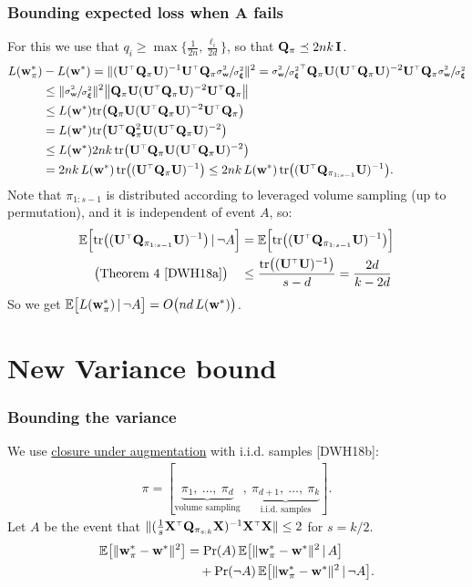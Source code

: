 \documentclass{beamer}
\begin{document}
\begin{frame}
  \frametitle{Bounding expected loss when A fails}
  For this we use that $q_i\geq
  \max\{\frac1{2n},\frac{\ell_i}{2d}\}$, so that $\mathbf Q_\pi\preceq 2nk\,\mathbf I$.
  \begin{align*}
    L(\w_\pi^*)& - L(\w^*)
= \|(\U^\top\Q_\pi\U)^{-1}\U^\top\Q_\pi\r\|^2 = \r^\top\Q_\pi\U (\U^\top\Q_\pi\U)^{-2}\U^\top\Q_\pi\r\\
&\leq \|\r\|^2 \big\|\Q_\pi\U (\U^\top\Q_\pi\U)^{-2}\U^\top\Q_\pi\big\|\\
&\leq L(\w^*)\tr\big(\Q_\pi\U
(\U^\top\Q_\pi\U)^{-2}\U^\top\Q_\pi\big)\\
&= L(\w^*)
\tr\big(\U^\top\Q_\pi^2\U(\U^\top\Q_\pi\U)^{-2}\big)\\
&\leq L(\w^*)2nk\, \tr\big(
\U^\top\Q_\pi\U(\U^\top\Q_\pi\U)^{-2}\big)\\
&=2nk\,L(\w^*)\,\tr\big((\U^\top\Q_\pi\U)^{-1}\big)\leq 2nk\,L(\w^*)\,\tr\big((\U^\top\Q_{\pi_{1:s-1}}\U)^{-1}\big).
  \end{align*}
Note that $\pi_{1:s-1}$ is distributed according to leveraged volume
sampling (up to permutation), and it is independent of event $A$, so:
\begin{align*}
  \E\Big[\tr\big((\U^\top\Q_{\pi_{1:s-1}}\U)^{-1}\big)\,|\,\neg A\Big]
  &=\E\Big[\tr\big((\U^\top\Q_{\pi_{1:s-1}}\U)^{-1}\big)\Big]\\
\big(\text{Theorem 4 [DWH18a]}\big)\quad  &\leq \frac{\tr\big((\U^\top\U)^{-1}\big)}{s-d}= \frac{2d}{k-2d}
\end{align*}
So we get $\mathbb E\big[L(\mathbf w_\pi^*)\,|\,\neg A\big]= O\big(nd\,L(\mathbf w^*)\big)$.
\end{frame}

\section{New Variance bound}

\begin{frame}
  \frametitle{Bounding the variance}
We use \underline{closure under augmentation} with i.i.d. samples [DWH18b]:
\begin{align*}
  \pi = [\underbrace{\pi_1,\ \dots,\ \pi_d}_{\text{volume
  sampling}}\ ,\ \underbrace{\pi_{d+1},\ \dots,\ \pi_k}_{\text{i.i.d.~samples}}].
\end{align*}
Let $A$ be the event that
$\|(\frac1s\X^\top\Q_{\pi_{s:k}}\X)^{-1}\X^\top\X\|\leq 2$ for $s=k/2$.
\begin{align*}
  \mathbb E\big[\|\mathbf w_\pi^*-\mathbf w^*\|^2\big]
  &= \mathrm{Pr}(A)\,\mathbb E\big[\|\mathbf w_\pi^*-\mathbf w^*\|^2\,|\,A\big] \\
  &\quad + \mathrm{Pr}(\neg A)\,\mathbb E\big[\|\mathbf w_\pi^*-\mathbf w^*\|^2\,|\,\neg A\big].
\end{align*}
\end{frame}
\end{document}
